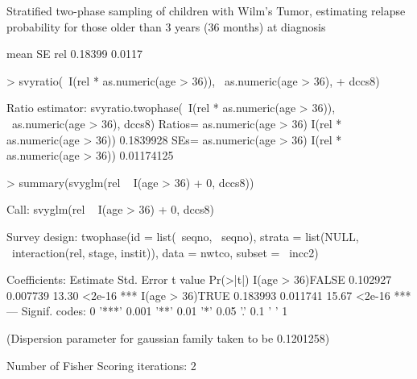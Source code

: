 \documentclass{article}
\begin{document}
Stratified two-phase sampling of children with Wilm's Tumor,
estimating relapse probability for those older than 3 years (36
months) at diagnosis
\begin{Schunk}
\begin{Soutput}
       mean     SE
rel 0.18399 0.0117
\end{Soutput}
\begin{Sinput}
> svyratio(~I(rel * as.numeric(age > 36)), ~as.numeric(age > 36), 
+     dccs8)
\end{Sinput}
\begin{Soutput}
Ratio estimator: svyratio.twophase(~I(rel * as.numeric(age > 36)), ~as.numeric(age > 
    36), dccs8)
Ratios=
                              as.numeric(age > 36)
I(rel * as.numeric(age > 36))            0.1839928
SEs=
                              as.numeric(age > 36)
I(rel * as.numeric(age > 36))           0.01174125
\end{Soutput}
\begin{Sinput}
> summary(svyglm(rel ~ I(age > 36) + 0, dccs8))
\end{Sinput}
\begin{Soutput}
Call:
svyglm(rel ~ I(age > 36) + 0, dccs8)

Survey design:
twophase(id = list(~seqno, ~seqno), strata = list(NULL, ~interaction(rel, 
    stage, instit)), data = nwtco, subset = ~incc2)

Coefficients:
                 Estimate Std. Error t value Pr(>|t|)    
I(age > 36)FALSE 0.102927   0.007739   13.30   <2e-16 ***
I(age > 36)TRUE  0.183993   0.011741   15.67   <2e-16 ***
---
Signif. codes:  0 '***' 0.001 '**' 0.01 '*' 0.05 '.' 0.1 ' ' 1 

(Dispersion parameter for gaussian family taken to be 0.1201258)

Number of Fisher Scoring iterations: 2
\end{Soutput}
\end{Schunk}
\end{document}
